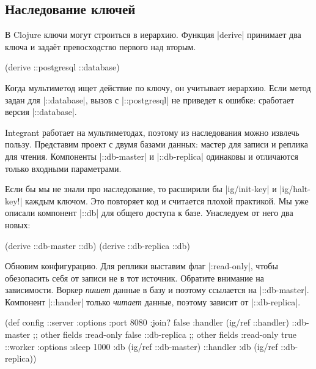\subsection{Наследование ключей}

В Clojure ключи могут строиться в иерархию. Функция \spverb|derive| принимает
два ключа и зада\"{е}т превосходство первого над вторым.

\begin{english}
  \begin{clojure}
(derive ::postgresql ::database)
  \end{clojure}
\end{english}

Когда мультиметод ищет действие по ключу, он учитывает иерархию. Если метод
задан для \spverb|::database|, вызов с \spverb|::postgresql| не приведет к
ошибке: сработает версия \spverb|::database|.

Integrant работает на мультиметодах, поэтому из наследования можно извлечь
пользу. Представим проект с двумя базами данных: мастер для записи и реплика для
чтения. Компоненты \spverb|::db-master| и \spverb|::db-replica| одинаковы и
отличаются только входными параметрами.

Если бы мы не знали про наследование, то расширили бы \spverb|ig/init-key| и
\spverb|ig/halt-key!| каждым ключом. Это повторяет код и считается плохой
практикой. Мы уже описали компонент \spverb|::db| для общего доступа к
базе. Унаследуем от него два новых:

\begin{english}
  \begin{clojure}
(derive ::db-master ::db)
(derive ::db-replica ::db)
  \end{clojure}
\end{english}

Обновим конфигурацию. Для реплики выставим флаг \spverb|:read-only|, чтобы
обезопасить себя от записи не в тот источник. Обратите внимание на
зависимости. Воркер \emph{пишет} данные в базу и поэтому ссылается на
\spverb|::db-master|. Компонент \spverb|::hander| только \emph{читает} данные,
поэтому зависит от \spverb|::db-replica|.

\begin{english}
  \begin{clojure}
(def config
  {::server {:options {:port 8080 :join? false}
             :handler (ig/ref ::handler)}
   ::db-master {;; other fields
                :read-only false}
   ::db-replica {;; other fields
                 :read-only true}
   ::worker {:options {:sleep 1000}
             :db (ig/ref ::db-master)}
   ::handler {:db (ig/ref ::db-replica)}})
  \end{clojure}
\end{english}


